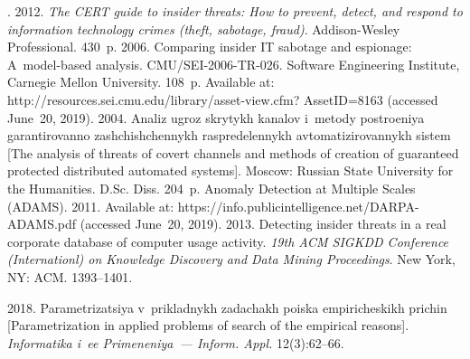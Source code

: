   \begin{multicols}{2}

\renewcommand{\bibname}{\protect\rmfamily References}

{\small\frenchspacing
 {%
 \begin{thebibliography}{99}
. 2012. \textit{The CERT guide to insider threats: 
How to prevent, detect, and respond to information technology crimes (theft, sabotage, fraud)}. 
Addison-Wesley Professional. 430~p.
 2006. Comparing 
insider IT sabotage and espionage: A~model-based analysis. CMU/SEI-2006-TR-026. Software 
Engineering Institute, Carnegie Mellon University. 108~p. Available at: {\sf 
http://resources.\linebreak  sei.cmu.edu/library/asset-view.cfm? AssetID=8163} (accessed June~20, 2019).
 2004. Analiz ugroz skrytykh kanalov i~metody postroeniya garantirovanno 
zashchishchennykh raspredelennykh avtomatizirovannykh sistem [The analysis of threats of covert 
channels and methods of creation of guaranteed protected distributed 
automated systems]. Moscow: Russian State University for the Humanities. 
D.Sc. Diss. 204~p. 
Anomaly Detection at Multiple Scales (ADAMS). 2011. Available at: {\sf 
https://info.publicintelligence.net/DARPA-ADAMS.pdf} (accessed June~20, 2019).
 2013. Detecting insider threats in a real corporate database 
of computer usage activity. \textit{19th ACM SIGKDD Conference (Internationl) on Knowledge 
Discovery and Data Mining Proceedings}. New York, NY: ACM. 1393--1401.

2018. Parametrizatsiya v~prikladnykh zadachakh poiska empiricheskikh prichin 
[Parametrization in applied problems of search of the empirical reasons]. 
\textit{Informatika i~ee Primeneniya~--- Inform. Appl.} 12(3):62--66.



\end{thebibliography}}}
\end{multicols}
